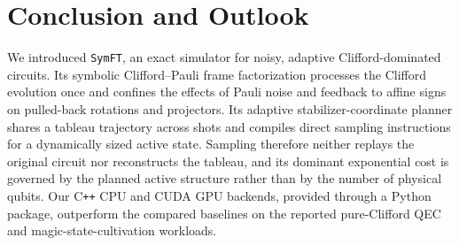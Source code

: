 \documentclass[a4paper,onecolumn,unpublished]{quantumarticle}
\newcommand{\tFont}[1]{\texttt{#1}}
\newcommand{\symft}{\tFont{SymFT}}
\begin{document}
\section{Conclusion and Outlook}
\label{sec:conclusion}

We introduced \symft{}, an exact simulator for noisy, adaptive Clifford-dominated circuits.
Its symbolic Clifford--Pauli frame factorization processes the Clifford evolution once and confines the effects of Pauli noise and feedback to affine signs on pulled-back rotations and projectors.
Its adaptive stabilizer-coordinate planner shares a tableau trajectory across shots and compiles direct sampling instructions for a dynamically sized active state.
Sampling therefore neither replays the original circuit nor reconstructs the tableau, and its dominant exponential cost is governed by the planned active structure rather than by the number of physical qubits.
Our C\texttt{++} CPU and CUDA GPU backends, provided through a Python package, outperform the compared baselines on the reported pure-Clifford QEC and magic-state-cultivation workloads.
\end{document}
